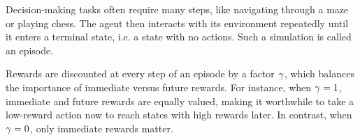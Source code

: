Decision-making tasks often require many steps, like navigating through a maze or playing chess. The agent then interacts with its environment repeatedly until it enters a terminal state, i.e. a state with no actions.
Such a simulation is called an episode.



\vspace{-0.6cm}


Rewards are discounted at every step of an episode by a factor $\gamma$, which balances the importance of immediate versus future rewards.
For instance, when $\gamma = 1$, 
immediate and future rewards are equally valued,
making it worthwhile to take a low-reward action now to reach states with high rewards later.
In contrast, when $\gamma = 0$, only immediate rewards matter.






